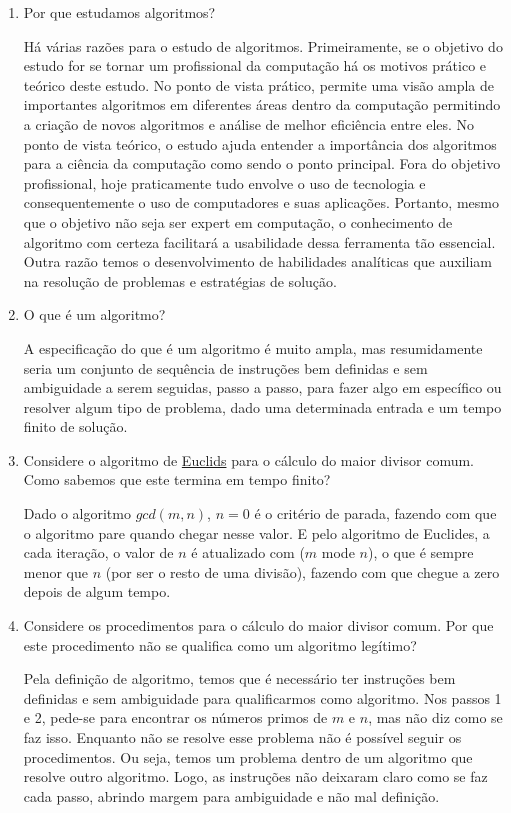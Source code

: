 \documentclass[12pt,a4paper]{article}
\begin{document}
\begin{enumerate}
	\item Por que estudamos algoritmos?
	
	Há várias razões para o estudo de algoritmos. Primeiramente, se o objetivo do estudo for se tornar um profissional da computação há os motivos prático e teórico deste estudo. No ponto de vista prático, permite uma visão ampla de importantes algoritmos em diferentes áreas dentro da computação permitindo a criação de novos algoritmos e análise de melhor eficiência entre eles. No ponto de vista teórico, o estudo ajuda entender a importância dos algoritmos para a ciência da computação como sendo o ponto principal. Fora do objetivo profissional, hoje praticamente tudo envolve o uso de tecnologia e consequentemente o uso de computadores e suas aplicações. Portanto, mesmo que o objetivo não seja ser expert em computação, o conhecimento de algoritmo com certeza facilitará a usabilidade dessa ferramenta tão essencial. Outra razão temos o desenvolvimento de habilidades analíticas que auxiliam na resolução de problemas e estratégias de solução.	
	
	
	\item O que é um algoritmo?
	
	A especificação do que é um algoritmo é muito ampla, mas resumidamente seria um conjunto de sequência de instruções bem definidas e sem ambiguidade a serem seguidas, passo a passo, para fazer algo em específico ou resolver algum tipo de problema, dado uma determinada entrada e um tempo finito de solução.
	
	
	\item Considere o algoritmo de
	\href{https://en.wikipedia.org/wiki/Euclidean_algorithm#Implementations}{Euclids} para o cálculo do maior divisor comum. Como sabemos que este termina em	tempo finito?
	
	Dado o algoritmo $gcd(m,n)$, $n = 0$ é o critério de parada, fazendo com que o algoritmo pare quando chegar nesse valor. E pelo algoritmo de Euclides, a cada iteração, o valor de $n$ é atualizado com ($m$ mode $n$), o que é sempre menor que $n$ (por ser o resto de uma divisão), fazendo com que chegue a zero depois de algum tempo.
	
	
	
	\item Considere os procedimentos para o cálculo do maior divisor comum. Por que este procedimento não se qualifica como um algoritmo legítimo?
	
	Pela definição de algoritmo, temos que é necessário ter instruções bem definidas e sem ambiguidade para qualificarmos como algoritmo. Nos passos 1 e 2, pede-se para encontrar os números primos de $m$ e $n$, mas não diz como se faz isso. Enquanto não se resolve esse problema não é possível seguir os procedimentos. Ou seja, temos um problema dentro de um algoritmo que resolve outro algoritmo. Logo, as instruções não deixaram claro como se faz cada passo, abrindo margem para ambiguidade e não mal definição.
	

\end{enumerate}
\end{document}
